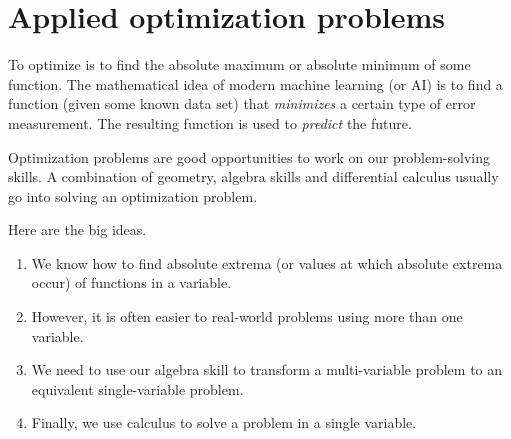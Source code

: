 \documentclass[../main.tex]{subfiles}
\begin{document}
 \section{Applied optimization problems}
To optimize is to find the absolute maximum or absolute minimum of some function. The mathematical idea of modern machine learning (or AI) is to find a function (given some known data set) that \emph{minimizes} a certain type of error measurement.  The resulting function is used to \emph{predict} the future.

Optimization problems are good opportunities to work on our problem-solving skills. A combination of geometry, algebra skills and differential calculus usually go into solving an optimization problem.

Here are the big ideas. 
\begin{enumerate}[label=(\alph*)]
  \item We know how to find absolute extrema (or values at which absolute extrema occur) of functions in a  variable.

  \item However, it is often easier to  real-world problems using more than one variable. 

  \item We need to use our algebra skill to transform a multi-variable problem to an equivalent single-variable problem.

  \item Finally, we use calculus to solve a problem in a single variable.
\end{enumerate}
\end{document}
